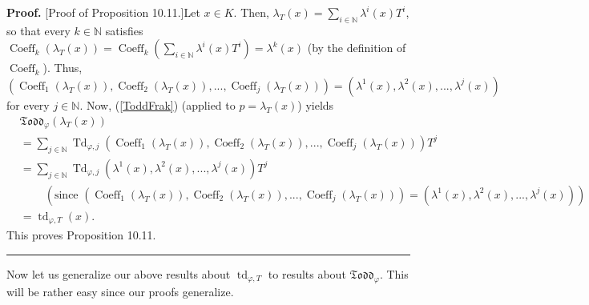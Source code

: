 \documentclass[numbers=enddot,12pt,final,onecolumn,notitlepage]{scrartcl}%
\newenvironment{proof}[1][Proof]{\noindent\textbf{#1.} }{\ \rule{0.5em}{0.5em}}
\begin{document}
\begin{proof}
[Proof of Proposition 10.11.]Let $x\in K$. Then, $\lambda_{T}\left(  x\right)
=\sum\limits_{i\in\mathbb{N}}\lambda^{i}\left(  x\right)  T^{i}$, so that
every $k\in\mathbb{N}$ satisfies $\operatorname*{Coeff}\nolimits_{k}\left(
\lambda_{T}\left(  x\right)  \right)  =\operatorname*{Coeff}\nolimits_{k}%
\left(  \sum\limits_{i\in\mathbb{N}}\lambda^{i}\left(  x\right)  T^{i}\right)
=\lambda^{k}\left(  x\right)  $ (by the definition of $\operatorname*{Coeff}%
\nolimits_{k}$). Thus, $\left(  \operatorname*{Coeff}\nolimits_{1}\left(
\lambda_{T}\left(  x\right)  \right)  ,\operatorname*{Coeff}\nolimits_{2}%
\left(  \lambda_{T}\left(  x\right)  \right)  ,...,\operatorname*{Coeff}%
\nolimits_{j}\left(  \lambda_{T}\left(  x\right)  \right)  \right)  =\left(
\lambda^{1}\left(  x\right)  ,\lambda^{2}\left(  x\right)  ,...,\lambda
^{j}\left(  x\right)  \right)  $ for every $j\in\mathbb{N}$. Now,
(\ref{ToddFrak}) (applied to $p=\lambda_{T}\left(  x\right)  $) yields%
\begin{align*}
&  \mathfrak{Todd}_{\varphi}\left(  \lambda_{T}\left(  x\right)  \right) \\
&  =\sum\limits_{j\in\mathbb{N}}\operatorname*{Td}\nolimits_{\varphi,j}\left(
\operatorname*{Coeff}\nolimits_{1}\left(  \lambda_{T}\left(  x\right)
\right)  ,\operatorname*{Coeff}\nolimits_{2}\left(  \lambda_{T}\left(
x\right)  \right)  ,...,\operatorname*{Coeff}\nolimits_{j}\left(  \lambda
_{T}\left(  x\right)  \right)  \right)  T^{j}\\
&  =\sum\limits_{j\in\mathbb{N}}\operatorname*{Td}\nolimits_{\varphi,j}\left(
\lambda^{1}\left(  x\right)  ,\lambda^{2}\left(  x\right)  ,...,\lambda
^{j}\left(  x\right)  \right)  T^{j}\\
&  \ \ \ \ \ \ \ \ \ \ \left(  \text{since }\left(  \operatorname*{Coeff}%
\nolimits_{1}\left(  \lambda_{T}\left(  x\right)  \right)
,\operatorname*{Coeff}\nolimits_{2}\left(  \lambda_{T}\left(  x\right)
\right)  ,...,\operatorname*{Coeff}\nolimits_{j}\left(  \lambda_{T}\left(
x\right)  \right)  \right)  =\left(  \lambda^{1}\left(  x\right)  ,\lambda
^{2}\left(  x\right)  ,...,\lambda^{j}\left(  x\right)  \right)  \right) \\
&  =\operatorname*{td}\nolimits_{\varphi,T}\left(  x\right)  .
\end{align*}
This proves Proposition 10.11.
\end{proof}

Now let us generalize our above results about $\operatorname*{td}%
\nolimits_{\varphi,T}$ to results about $\mathfrak{Todd}_{\varphi}$. This will
be rather easy since our proofs generalize.
\end{document}
